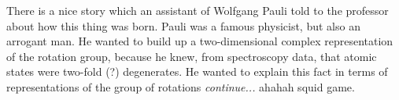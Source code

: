 \documentclass[../main.tex]{subfiles}
\begin{document}
There is a nice story which an assistant of Wolfgang Pauli told to the professor about how this thing was born. Pauli was a famous physicist, but also an arrogant man. He wanted to build up a two-dimensional complex representation of the rotation group, because he knew, from spectroscopy data, that atomic states were two-fold (?) degenerates. He wanted to explain this fact in terms of representations of the group of rotations \textit{continue...} ahahah squid game. 
\end{document}
